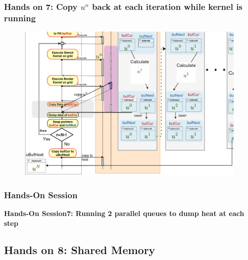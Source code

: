 \documentclass[9pt]{beamer}
\begin{document}
\begin{frame}
\frametitle{Hands on 7: Copy $u^{n}$ back at each iteration while kernel is running}
\begin{figure}
    \centering
    \includegraphics[width=0.8\linewidth]{Screenshot from 2024-10-17 16-11-14.png}
    \label{fig:enter-label}
\end{figure}
\end{frame}


\begin{frame}
\frametitle{Hands-On Session}
\begin{center}
      \Huge \textbf{Hands-On Session7: Running 2 parallel queues to dump heat at each step}
  \end{center}
\end{frame}
\subsection{Hands on 8: Shared Memory}
\end{document}
